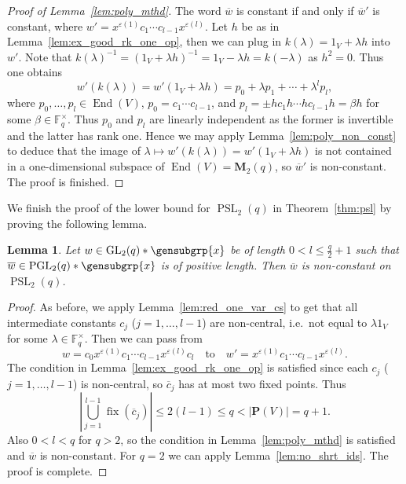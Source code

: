 \documentclass[a4paper,11pt]{amsproc}
\newcommand{\card}[1]{\left\lvert#1\right\rvert}%
\newcommand{\finfield}{\mathbb{F}}%
\DeclareMathOperator{\fix}{fix}%
\newcommand{\M}{\mathbf{M}}%
\DeclareMathOperator{\End}{End}%
\DeclareMathOperator{\GL}{GL}%
\DeclareMathOperator{\PSL}{PSL}%
\DeclareMathOperator{\PGL}{PGL}%
\newcommand{\proj}{\mathbf P}%
\theoremstyle{plain}
\newtheorem{lemma}{Lemma}[section]
\theoremstyle{definition}
\begin{document}
	\begin{proof}[Proof of Lemma~\ref{lem:poly_mthd}]
		The word $\overline{w}$ is constant if and only if $\overline{w}'$ is constant, where $w'=x^{\varepsilon(1)} c_1 \cdots c_{l-1} x^{\varepsilon(l)}$. Let $h$ be as in Lemma~\ref{lem:ex_good_rk_one_op}, then we can plug in $k(\lambda)=1_V+\lambda h$ into $w'$.
		Note that $k(\lambda)^{-1}=(1_V+\lambda h)^{-1}=1_V-\lambda h=k(-\lambda)$ as $h^2=0$. Thus one obtains
		$$
		w'(k(\lambda))=w'(1_V+\lambda h)=p_0+\lambda p_1+\cdots+\lambda^l p_l,
		$$
		where $p_0,\ldots,p_l\in\End(V)$, $p_0=c_1\cdots c_{l-1}$, and $p_l=\pm hc_1 h\cdots h c_{l-1}h=\beta h$ for some $\beta\in\finfield_q^\times$. Thus $p_0$ and $p_l$ are linearly independent as the former is invertible and the latter has rank one. Hence we may apply Lemma~\ref{lem:poly_non_const} to deduce that the image of $\lambda\mapsto w'(k(\lambda))=w'(1_V+\lambda h)$ is not contained in a one-dimensional subspace of $\End(V)=\M_2(q)$, so $\overline{w}'$ is non-constant. The proof is finished.
	\end{proof}
	
	We finish the proof of the lower bound for $\PSL_2(q)$ in Theorem~\ref{thm:psl} by proving the following lemma.
	
	\begin{lemma}\label{lem:psl_2_fnl_lem}
		Let $w\in\GL_2(q)\ast\gensubgrp{x}$ be of length $0<l\leq\frac{q}{2}+1$ such that $\overline{w}\in\PGL_2(q)\ast\gensubgrp{x}$ is of positive length. Then $\overline{w}$ is non-constant on $\PSL_2(q)$.
	\end{lemma}
	
	\begin{proof}
		As before, we apply Lemma~\ref{lem:red_one_var_cs} to get that all intermediate constants $c_j$ ($j=1,\ldots,l-1$) are non-central, i.e.\ not equal to $\lambda 1_V$ for some $\lambda\in\finfield_q^\times$. Then we can pass from 
		$$
		w=c_0 x^{\varepsilon(1)} c_1 \cdots c_{l-1} x^{\varepsilon(l)} c_l \quad \mbox{to} \quad 
		w'=x^{\varepsilon(1)} c_1 \cdots c_{l-1} x^{\varepsilon(l)}.
		$$ 
		The condition in Lemma~\ref{lem:ex_good_rk_one_op} is satisfied since each $c_j$ ($j=1,\ldots,l-1$) is non-central, so $\overline{c}_j$ has at most two fixed points. Thus 
		$$
		\card{\bigcup_{j=1}^{l-1}{\fix(\overline{c}_j)}}\leq2(l-1)\leq q<\card{\proj(V)}=q+1.
		$$ 
		Also $0<l<q$ for $q>2$, so the condition in Lemma~\ref{lem:poly_mthd} is satisfied and $\overline{w}$ is non-constant. For $q=2$ we can apply Lemma~\ref{lem:no_shrt_ids}. The proof is complete.
	\end{proof}
	
\end{document}
